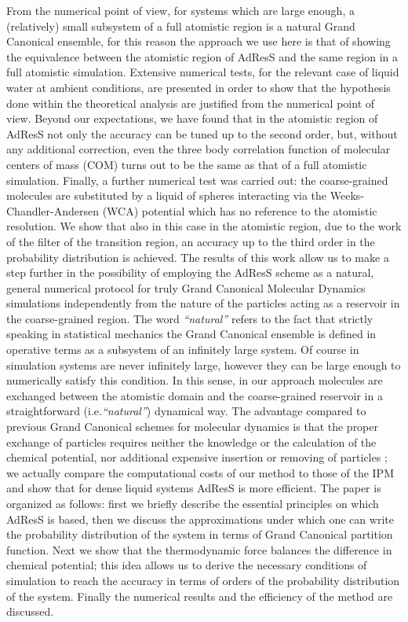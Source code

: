 \documentclass[aip,jcp,a4paper,reprint,onecolumn]{revtex4-1}
\begin{document}
From the numerical point of view, for systems which are large enough, a (relatively) small subsystem of a full atomistic region is a 
natural Grand Canonical ensemble, for this reason the approach we use here is that of showing the equivalence between the atomistic region of AdResS and the same region in a full atomistic simulation.
Extensive numerical tests, for the relevant case of liquid water at ambient conditions, are presented in order to show that the hypothesis done within the theoretical analysis are justified from the numerical point of view. Beyond our expectations, we have found that in the atomistic region of AdResS not only the accuracy can be tuned up to the second order, but, without any additional correction, even the three body correlation function of molecular centers of mass (COM) turns out to be the same as that of a full atomistic simulation. Finally, a further numerical test was carried out: the coarse-grained molecules are substituted by a liquid of spheres interacting via the Weeks-Chandler-Andersen (WCA)  potential \cite{wca} which has no reference to the atomistic resolution. We show that also in this case in the atomistic region, due to the work of the filter of the transition region, an accuracy up to the third order in the probability distribution is achieved.
The results of this work allow us to make a step further in the possibility of employing the AdResS scheme as a natural, general numerical protocol for truly Grand Canonical Molecular Dynamics simulations
independently from the nature of the particles acting as a reservoir in the coarse-grained region. The word {\it ``natural''} refers to the fact  that strictly speaking in statistical mechanics the Grand Canonical ensemble is defined in operative terms as a subsystem of an infinitely large system. Of course in simulation systems are never infinitely large, however they can be large enough to numerically satisfy this condition. 
In this sense, in our approach molecules are exchanged between the atomistic domain and the coarse-grained reservoir in a straightforward (i.e.{\it ``natural''}) dynamical way. The advantage compared to previous Grand Canonical schemes for molecular dynamics is that the proper exchange of particles requires neither the knowledge or the calculation of the chemical potential, nor additional expensive insertion or removing of particles \cite{pet1,pet2,pet3,pet4,pet5,flo}; we actually compare the computational costs of our method to those of the IPM and show that for dense liquid systems AdResS is more efficient.
The paper is organized as follows: first we briefly describe the essential principles on which AdResS is based, then we discuss the approximations under which one can write the probability distribution of the system in terms of Grand Canonical partition function. Next we show that the thermodynamic force balances the difference in chemical potential; this idea allows us to derive the necessary conditions of simulation to reach the accuracy in terms of orders of the probability distribution of the system. 
Finally the numerical results and the efficiency of the method are discussed.
\end{document}
